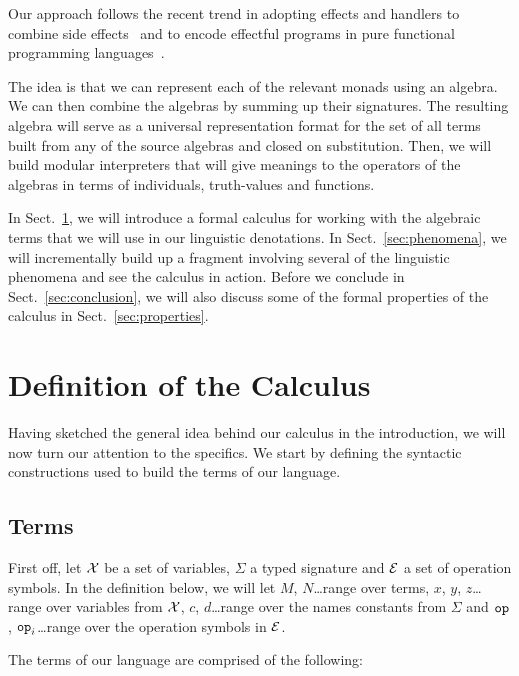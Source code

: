 \documentclass{llncs}
\begin{document}
Our approach follows the recent trend in adopting effects and handlers to
combine side effects~\cite{bauer2012programming,kammar2013handlers} and to
encode effectful programs in pure functional programming
languages~\cite{kiselyov2013extensible,brady2013programming}.

The idea is that we can represent each of the relevant monads using an
algebra. We can then combine the algebras by summing up their
signatures. The resulting algebra will serve as a universal representation
format for the set of all terms built from any of the source algebras and
closed on substitution. Then, we will build modular interpreters that will
give meanings to the operators of the algebras in terms of individuals,
truth-values and functions.

In Sect.~\ref{sec:definition}, we will introduce a formal calculus for
working with the algebraic terms that we will use in our linguistic
denotations. In Sect.~\ref{sec:phenomena}, we will incrementally build up a
fragment involving several of the linguistic phenomena and see the calculus
in action. Before we conclude in Sect.~\ref{sec:conclusion}, we will also
discuss some of the formal properties of the calculus in
Sect.~\ref{sec:properties}.


\section{Definition of the Calculus}
\label{sec:definition}

Having sketched the general idea behind our calculus in the introduction,
we will now turn our attention to the specifics. We start by defining the
syntactic constructions used to build the terms of our language.

\subsection{Terms}
\label{ssec:terms}

First off, let $\mathcal{X}$ be a set of variables, $\Sigma$ a typed signature and
$\mathcal{E}$ a set of operation symbols. In the definition below, we will let $M$,
$N$\ldots range over terms, $x$, $y$, $z$\ldots range over variables from
$\mathcal{X}$, $c$, $d$\ldots range over the names constants from $\Sigma$ and
$\mathtt{op}$, $\mathtt{op}_i$\ldots range over the operation symbols in $\mathcal{E}$.

The terms of our language are comprised of the following:
\end{document}

